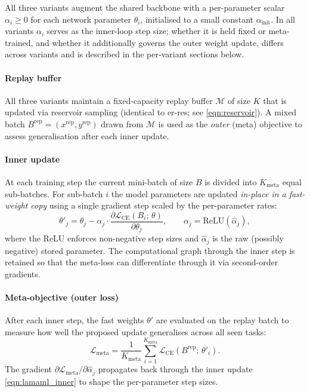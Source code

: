 All three variants augment the shared backbone with a per-parameter scalar $\alpha_i \geq 0$ for each network parameter $\theta_i$, initialised to a small constant $\alpha_\text{init}$. In all variants $\alpha_i$ serves as the inner-loop step size; whether it is held fixed or meta-trained, and whether it additionally governs the outer weight update, differs across variants and is described in the per-variant sections below.

\paragraph{Replay buffer}

All three variants maintain a fixed-capacity replay buffer $\mathcal{M}$ of size $K$ that is updated via reservoir sampling (identical to \gls{er-res}; see \eqref{eqn:reservoir}). A mixed batch $B^\text{rep} = (x^\text{rep}, y^\text{rep})$ drawn from $\mathcal{M}$ is used as the \emph{outer} (meta) objective to assess generalisation after each inner update.

\paragraph{Inner update}

At each training step the current mini-batch of size $B$ is divided into $K_\text{meta}$ equal sub-batches. For sub-batch $i$ the model parameters are updated \emph{in-place in a fast-weight copy} using a single gradient step scaled by the per-parameter rates:
%
\begin{equation}\label{eqn:lamaml_inner}
    \theta'_j
    =
    \theta_j
    -
    \alpha_j \cdot
    \frac{\partial \mathcal{L}_\text{CE}(B_i;\,\theta)}
         {\partial \theta_j},
    \qquad
    \alpha_j = \mathrm{ReLU}(\hat\alpha_j),
\end{equation}
%
where the ReLU enforces non-negative step sizes and $\hat\alpha_j$ is the raw (possibly negative) stored parameter. The computational graph through the inner step is retained so that the meta-loss can differentiate through it via second-order gradients.

\paragraph{Meta-objective (outer loss)}

After each inner step, the fast weights $\theta'$ are evaluated on the replay batch to measure how well the proposed update generalises across all seen tasks:
%
\begin{equation}\label{eqn:lamaml_meta_loss}
    \mathcal{L}_\text{meta}
    =
    \frac{1}{K_\text{meta}}
    \sum_{i=1}^{K_\text{meta}}
    \mathcal{L}_\text{CE}\!\left(B^\text{rep};\, \theta'_i\right).
\end{equation}
%
The gradient $\partial \mathcal{L}_\text{meta} / \partial \hat\alpha_j$ propagates back through the inner update \eqref{eqn:lamaml_inner} to shape the per-parameter step sizes.

